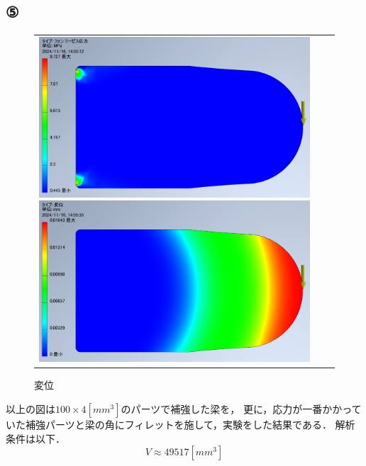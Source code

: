 \subsection{⑤}
  \begin{figure}[H]
    \begin{tabular}{ccc}
      \begin{minipage}{.5\textwidth}
        \centering
        \includegraphics[width=0.99\linewidth]{images/5_voms.png}
        \caption{応力}
        \label{img:5_voms}
      \end{minipage}
      \begin{minipage}{.5\textwidth}
        \centering
        \includegraphics[width=0.99\linewidth]{images/5_disp.png}
        \caption{変位}
        \label{img:5_disp}
      \end{minipage}
    \end{tabular}
  \end{figure}

  以上の図は$100 \times 4[mm^3]$のパーツで補強した梁を，
  更に，応力が一番かかっていた補強パーツと梁の角にフィレットを施して，実験をした結果である．
  解析条件は以下．
  \begin{equation*}
    V \approx 49517[mm^3]
  \end{equation*}

